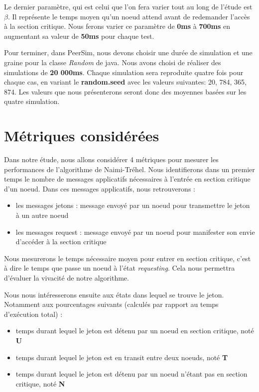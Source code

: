 \documentclass[12pt,a4paper]{article}
\begin{document}
Le dernier paramètre, qui est celui que l'on fera varier tout au long de l'étude est $\beta$. Il représente le temps moyen qu'un noeud attend avant de redemander l'accès à la section critique. Nous ferons varier ce paramètre de \textbf{0ms} à \textbf{700ms} en augmentant sa valeur de \textbf{50ms} pour chaque test.

Pour terminer, dans PeerSim, nous devons choisir une durée de simulation et une graine pour la classe \textit{Random} de java. Nous avons choisi de réaliser des simulations de \textbf{20 000ms}. Chaque simulation sera reproduite quatre fois pour chaque cas, en variant le \textbf{random.seed} avec les valeurs suivantes: 20, 784, 365, 874. Les valeurs que nous présenterons seront donc des moyennes basées sur les quatre simulation.


\section{Métriques considérées}

Dans notre étude, nous allons considérer 4 métriques pour mesurer les performances de l'algorithme de Naimi-Tréhel. Nous identifierons dans un premier temps le nombre de messages applicatifs nécessaires à l'entrée en section critique d'un noeud. Dans ces messages applicatifs, nous retrouverons : 
\begin{itemize}
\item les messages jetons : message envoyé par un noeud pour transmettre le jeton à un autre noeud
\item les messages request : message envoyé par un noeud pour manifester son envie d'accéder à la section critique
\end{itemize} 


Nous mesurerons le temps nécessaire moyen pour entrer en section critique, c'est à dire le temps que passe un noeud à l'état \textit{requesting}. Cela nous permettra d'évaluer la vivacité de notre algorithme.

Nous nous intéresserons ensuite aux états dans lequel se trouve le jeton. Notamment aux pourcentages suivants (calculés par rapport au temps d'exécution total) :
\begin{itemize}
\item temps durant lequel le jeton est détenu par un noeud en section critique, noté \textbf{U}
\item temps durant lequel le jeton est en transit entre deux noeuds, noté \textbf{T}
\item temps durant lequel le jeton est détenu par un noeud n'étant pas en section critique, noté \textbf{N}
\end{itemize} 
\end{document}
